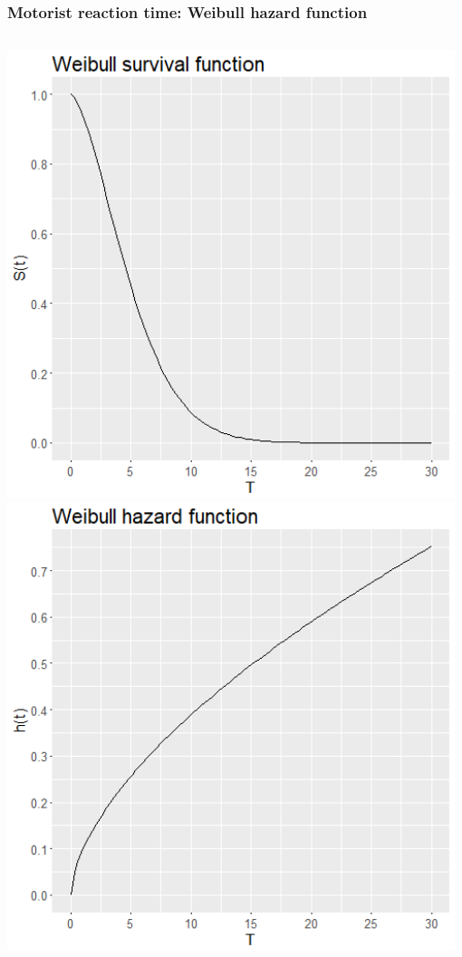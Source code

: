 \begin{frame}
\frametitle{Motorist reaction time: Weibull hazard function}
\begin{columns}
\includegraphics[width=0.98\textwidth]{Figures/motorist_surv_weib.png}
\includegraphics[width=0.98\textwidth]{Figures/motorist_haz_weib.png}
\end{columns}
\end{frame}

